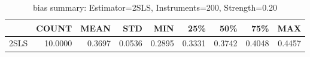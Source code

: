 \begin{table}[ht]
\centering
\caption{bias summary: Estimator=2SLS, Instruments=200, Strength=0.20}
\begin{tabular}{lrrrrrrrr}
\toprule
 & COUNT & MEAN & STD & MIN & 25\% & 50\% & 75\% & MAX \\
\midrule
2SLS & 10.0000 & 0.3697 & 0.0536 & 0.2895 & 0.3331 & 0.3742 & 0.4048 & 0.4457 \\
\bottomrule
\end{tabular}
\end{table}

